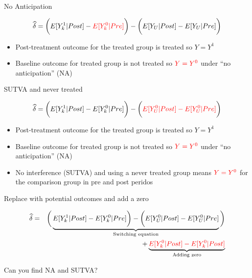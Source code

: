 \documentclass{beamer}
\begin{document}
\begin{frame}{No Anticipation}


\begin{eqnarray*}
\widehat{\delta} = \bigg ( E[Y^1_k|Post] - \textcolor{red}{E[Y^0_k|Pre]} \bigg ) - \bigg ( E[Y_U | Post ] - E[ Y_U | Pre] \bigg) \\
\end{eqnarray*}

\begin{itemize}
\item Post-treatment outcome for the treated group is treated so $Y=Y^1$
\item Baseline outcome for treated group is not treated so $\textcolor{red}{Y=Y^0}$ under ``no anticipation'' (NA)
\end{itemize}


\end{frame}





\begin{frame}{SUTVA and never treated}


\begin{eqnarray*}
\widehat{\delta} = \bigg ( E[Y^1_k|Post] - \textcolor{black}{E[Y^0_k|Pre]} \bigg ) - \bigg ( \textcolor{red}{E[Y^0_U | Post ] - E[ Y^0_U | Pre] }\bigg) \\
\end{eqnarray*}

\begin{itemize}
\item Post-treatment outcome for the treated group is treated so $Y=Y^1$
\item Baseline outcome for treated group is not treated so $\textcolor{red}{Y=Y^0}$ under ``no anticipation'' (NA)
\item No interference (SUTVA) and using a never treated group means $\textcolor{red}{Y=Y^0}$ for the comparison group in pre and post peridos
\end{itemize}


\end{frame}




\begin{frame}{Replace with potential outcomes and add a zero}

\begin{eqnarray*}
\widehat{\delta} &=& \bigg ( \underbrace{E[Y^1_k|Post] - E[Y^0_k|Pre] \bigg ) - \bigg ( E[Y^0_U | Post ] - E[ Y^0_U | Pre]}_{\mathclap{\text{Switching equation}}} \bigg)  \\
&&+ \underbrace{\textcolor{red}{E[Y_k^0 |Post] - E[Y^0_k | Post]}}_{\mathclap{\text{Adding zero}}} 
\end{eqnarray*}

Can you find NA and SUTVA?

\end{frame}
\end{document}
